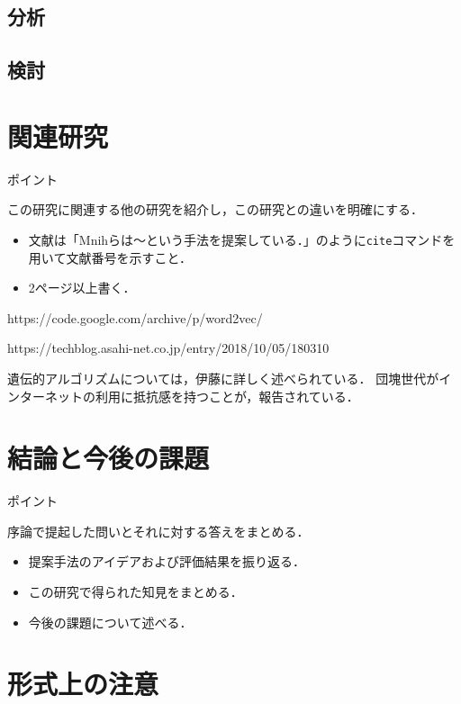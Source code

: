 \documentclass[a4j,11pt,report]{jsbook}
\newcommand{\point}[1]{
\begin{itembox}[l]{ポイント}
  #1
\end{itembox}
}
\begin{document}
\section{分析}
\section{検討}





\chapter{関連研究\label{ch:relatedwork}}
\point{
この研究に関連する他の研究を紹介し，この研究との違いを明確にする．
\begin{itemize}
  \item 文献は「Mnihらは～という手法を提案している\cite{one1}．」のように\texttt{cite}コマンドを用いて文献番号を示すこと．
  \item 2ページ以上書く．
\end{itemize}

https://code.google.com/archive/p/word2vec/

https://techblog.asahi-net.co.jp/entry/2018/10/05/180310


}


遺伝的アルゴリズムについては，伊藤\cite{伊藤}に詳しく述べられている．
団塊世代がインターネットの利用に抵抗感を持つことが，報告されている．\cite{miki:internet}



\chapter{結論と今後の課題 \label{ch:conclusion}}

\point{
序論で提起した問いとそれに対する答えをまとめる．
\begin{itemize}
  \item 提案手法のアイデアおよび評価結果を振り返る．
  \item この研究で得られた知見をまとめる．
  \item 今後の課題について述べる．
\end{itemize}
}

%
%


\chapter{形式上の注意}
\end{document}

